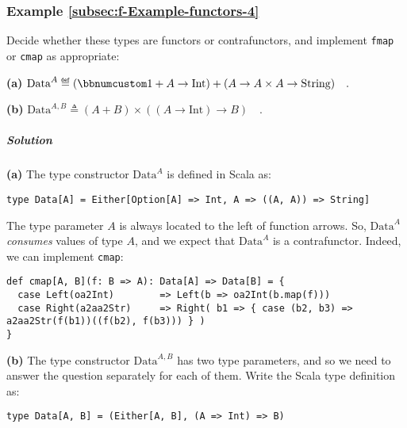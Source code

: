 \subsubsection{Example \label{subsec:f-Example-functors-4}\ref{subsec:f-Example-functors-4}}

Decide whether these types are functors or contrafunctors, and implement
\lstinline!fmap! or \lstinline!cmap! as appropriate:

\textbf{(a)} $\text{Data}^{A}\triangleq\left(\bbnum 1+A\rightarrow\text{Int}\right)+(A\rightarrow A\times A\rightarrow\text{String})\quad.$ 

\textbf{(b)} $\text{Data}^{A,B}\triangleq\left(A+B\right)\times\left(\left(A\rightarrow\text{Int}\right)\rightarrow B\right)\quad.$

\subparagraph{Solution}

\textbf{(a)} The type constructor $\text{Data}^{A}$ is defined in
Scala as:
\begin{lstlisting}
type Data[A] = Either[Option[A] => Int, A => ((A, A)) => String]
\end{lstlisting}
The type parameter $A$ is always located to the left of function
arrows. So, $\text{Data}^{A}$ \emph{consumes} values of type $A$,
and we expect that $\text{Data}^{A}$ is a contrafunctor. Indeed,
we can implement \lstinline!cmap!:
\begin{lstlisting}
def cmap[A, B](f: B => A): Data[A] => Data[B] = {
  case Left(oa2Int)        => Left(b => oa2Int(b.map(f)))
  case Right(a2aa2Str)     => Right( b1 => { case (b2, b3) => a2aa2Str(f(b1))((f(b2), f(b3))) } )
}
\end{lstlisting}

\textbf{(b)} The type constructor $\text{Data}^{A,B}$ has two type
parameters, and so we need to answer the question separately for each
of them. Write the Scala type definition as:
\begin{lstlisting}
type Data[A, B] = (Either[A, B], (A => Int) => B)
\end{lstlisting}


